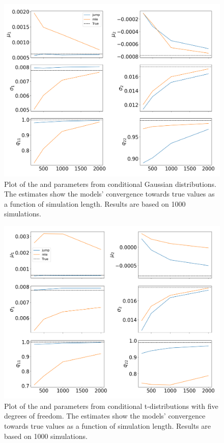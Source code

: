 \begin{figure}[H] 
    \centering
    \includegraphics[width=1\textwidth]{analysis/model_convergence/images/simulation_normal.png}
    \caption[Plot of the \mle and \jump parameters, from conditional Gaussian distribution, showing the convergence to the true values]{Plot of the \mle and \jump parameters from conditional Gaussian distributions. The estimates show the models' convergence towards true values as a function of simulation length. Results are based on 1000 simulations.}
    \label{fig:jump_normal}
\end{figure}

\begin{figure}[H] 
    \centering
    \includegraphics[width=1\textwidth]{analysis/model_convergence/images/simulation_t.png}
    
    \caption[Plot of the \mle and \jump parameters, from conditional t-distributions with five degrees of freedom, showing the convergence to the true values]{Plot of the \mle and \jump parameters from conditional t-distributions with five degrees of freedom. The estimates show the models' convergence towards true values as a function of simulation length. Results are based on 1000 simulations.}
    \label{fig:jump_t}
\end{figure}

